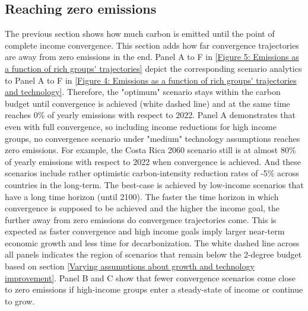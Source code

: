 \documentclass{article}
\begin{document}
\FloatBarrier

\subsection{Reaching zero emissions}\label{reaching-zero}

The previous section shows how much carbon is emitted until the point of complete income convergence. This section adds how far convergence trajectories are away from zero emissions in the end. Panel A to F in \ref{Figure 5: Emissions as a function of rich groups' trajectories} depict the corresponding scenario analytics to Panel A to F in \ref{Figure 4: Emissions as a function of rich groups' trajectories and technology}. Therefore, the "optimum" scenario stays within the carbon budget until convergence is achieved (white dashed line) and at the same time reaches 0\% of yearly emissions with respect to 2022. Panel A demonstrates that even with full convergence, so including income reductions for high income groups, no convergence scenario under "medium" technology assumptions reaches zero emissions. For example, the Costa Rica 2060 scenario still is at almost 80\% of yearly emissions with respect to 2022 when convergence is achieved. And these scenarios include rather optimistic carbon-intensity reduction rates of -5\% across countries in the long-term. The best-case is achieved by low-income scenarios that have a long time horizon (until 2100). The faster the time horizon in which convergence is supposed to be achieved and the higher the income goal, the further away from zero emissions do convergence trajectories come. This is expected as faster convergence and high income goals imply larger near-term economic growth and less time for decarbonization. The white dashed line across all panels indicates the region of scenarios that remain below the 2-degree budget based on section \ref{Varying assumptions about growth and technology improvement}. Panel B and C show that fewer convergence scenarios come close to zero emissions if high-income groups enter a steady-state of income or continue to grow. %
\end{document}
